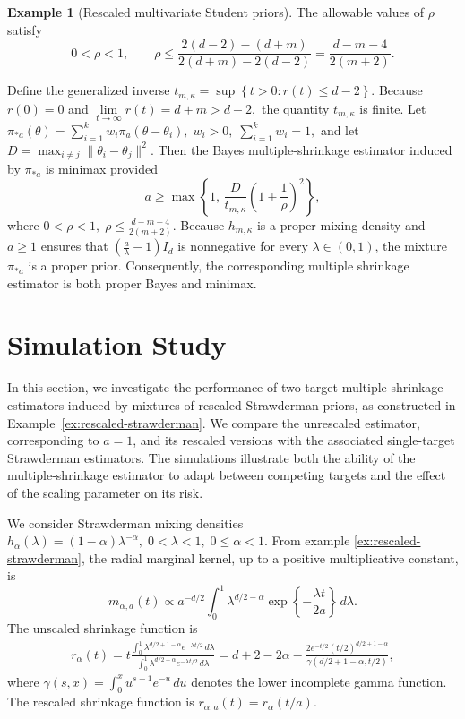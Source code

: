 \documentclass[11pt]{article}
\theoremstyle{definition}
\newtheorem{example}{Example}
\begin{document}
\begin{example}[Rescaled multivariate Student priors]
The allowable values of $\rho$ satisfy
\[
0<\rho<1,
\qquad
\rho\leq
\frac{2(d-2)-(d+m)}
     {2(d+m)-2(d-2)}
=
\frac{d-m-4}{2(m+2)}.
\]

Define the generalized inverse $t_{m,\kappa}
=
\sup\left\{
t>0:r(t)\leq d-2
\right\}.$ Because $r(0)=0$ and $\lim\limits_{t\to\infty}r(t)=d+m>d-2,$ the quantity $t_{m,\kappa}$ is finite. Let $\pi_{*a}(\theta)
=
\sum_{i=1}^k
w_i\pi_a(\theta-\theta_i),
\;
w_i>0,
\;
\sum_{i=1}^k w_i=1,$
and let $D
=
\max_{i\neq j}
\|\theta_i-\theta_j\|^2.$
Then the Bayes multiple-shrinkage estimator induced by
$\pi_{*a}$ is minimax provided
\[
a
\geq
\max\left\{
1,\,
\frac{D}{t_{m,\kappa}}
\left(1+\frac1\rho\right)^2
\right\},
\]
where $0<\rho<1,
\;
\rho\leq
\frac{d-m-4}{2(m+2)}.$ Because $h_{m,\kappa}$ is a proper mixing density and $a\geq1$
ensures that $\left(\frac a\lambda-1\right)I_d$ is nonnegative for every $\lambda\in(0,1)$, the mixture
$\pi_{*a}$ is a proper prior. Consequently, the corresponding
multiple shrinkage estimator is both proper Bayes and minimax.
\end{example}


\section{Simulation Study}
\label{Simulation Study}
In this section, we investigate the performance of two-target multiple-shrinkage estimators induced by mixtures of rescaled Strawderman priors, as constructed in Example~\ref{ex:rescaled-strawderman}. We compare the unrescaled estimator, corresponding to $a=1$, and its rescaled versions with the associated single-target Strawderman estimators. The simulations illustrate both the ability of the multiple-shrinkage estimator to adapt between competing targets and the effect of the scaling parameter on its risk.

We consider Strawderman mixing densities $h_\alpha(\lambda) = (1-\alpha)\lambda^{-\alpha},
\; 0<\lambda<1, \; 0\leq\alpha<1.$ From example \ref{ex:rescaled-strawderman}, the
radial marginal kernel, up to a positive multiplicative constant, is
\[
m_{\alpha,a}(t)
\propto
a^{-d/2}
\int_0^1
\lambda^{d/2-\alpha}
\exp\left\{
-\frac{\lambda t}{2a}
\right\}
\,d\lambda.
\]
The unscaled shrinkage function is
\begin{align*}
    r_\alpha(t)
=
t
\frac{\int_0^1
\lambda^{d/2+1-\alpha}
e^{-\lambda t/2}
\,d\lambda
}{\int_0^1
\lambda^{d/2-\alpha}
e^{-\lambda t/2}
\,d\lambda} =
d+2-2\alpha
-
\frac{
2e^{-t/2}(t/2)^{d/2+1-\alpha}
}{
\gamma\left(
d/2+1-\alpha,t/2
\right)
},
\end{align*}
where $\gamma(s,x)
=
\int_0^x u^{s-1}e^{-u}\,du$ denotes the lower incomplete gamma function. The rescaled shrinkage function is $r_{\alpha,a}(t)
=
r_\alpha(t/a).$ 
\end{document}
